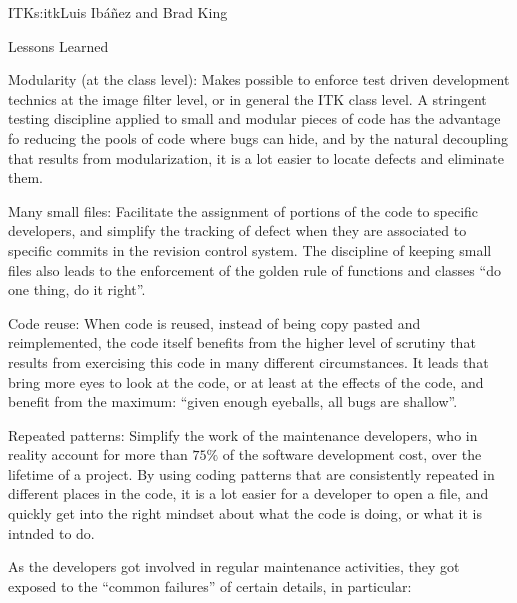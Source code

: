 \begin{aosachapter}{ITK}{s:itk}{Luis Ib\'{a}\~{n}ez and Brad King}
\begin{aosasect1}{Lessons Learned}
\begin{aosaitemize}
\item Modularity (at the class level): Makes possible to enforce test
driven development technics at the image filter level, or in general
the ITK class level. A stringent testing discipline applied to small
and modular pieces of code has the advantage fo reducing the pools of
code where bugs can hide, and by the natural decoupling that results
from modularization, it is a lot easier to locate defects and
eliminate them.
\item Many small files: Facilitate the assignment of portions of the
code to specific developers, and simplify the tracking of defect when
they are associated to specific commits in the revision control
system. The discipline of keeping small files also leads to the
enforcement of the golden rule of functions and classes ``do one
thing, do it right''.
\item Code reuse: When code is reused, instead of being copy pasted
and reimplemented, the code itself benefits from the higher level of
scrutiny that results from exercising this code in many different
circumstances. It leads that bring more eyes to look at the code, or
at least at the effects of the code, and benefit from the maximum:
``given enough eyeballs, all bugs are shallow''.
\item Repeated patterns: Simplify the work of the maintenance
developers, who in reality account for more than $75\%$ of the
software development cost, over the lifetime of a project. By using
coding patterns that are consistently repeated in different places in
the code, it is a lot easier for a developer to open a file, and
quickly get into the right mindset about what the code is doing, or
what it is intnded to do.
\end{aosaitemize}

As the developers got involved in regular maintenance activities, they
got exposed to the ``common failures'' of certain details, in particular:


\end{aosasect1}
\end{aosachapter}
